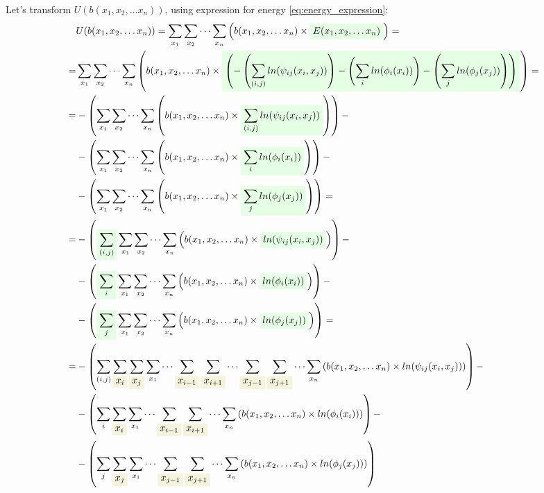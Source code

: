 \documentclass[fleqn,leqno]{article}
\newcommand{\highlight}[1]{\colorbox{green!10}{$\displaystyle#1$}}
\newcommand{\highlightred}[1]{\colorbox{olive!10}{$\displaystyle#1$}}
\begin{document}
Let's transform $U(b(x_1,x_2,\dots x_n))$, using expression for energy \eqref{eq:energy_expression}:
\begin{equation}
\begin{split}
   & U(b(x_1,x_2,\dots x_n)) = \sum_{x_1} \sum_{x_2} \cdots \sum_{x_n} \left( b(x_1, x_2, \dots x_n) \times \highlight{E(x_1, x_2, \dots x_n)} \right) = \\
= & \sum_{x_1} \sum_{x_2} \cdots \sum_{x_n} \left( b(x_1, x_2, \dots x_n) \times \highlight{\left( - \left( \sum_{(i, j)} ln(\psi_{ij}(x_i, x_j)) \right) - \left( \sum_{i} ln(\phi_i(x_i)) \right) - \left( \sum_{j} ln(\phi_j(x_j)) \right) \right)} \right) = \\
= & -\left( \sum_{x_1} \sum_{x_2} \cdots \sum_{x_n} \left( b(x_1, x_2, \dots x_n) \times \highlight{\sum_{(i, j)} ln(\psi_{ij}(x_i, x_j))} \right) \right) - \\ 
   & -\left( \sum_{x_1} \sum_{x_2} \cdots \sum_{x_n} \left( b(x_1, x_2, \dots x_n) \times \highlight{\sum_{i} ln(\phi_{i}(x_i))} \right) \right) - \\ 
   & -\left( \sum_{x_1} \sum_{x_2} \cdots \sum_{x_n} \left( b(x_1, x_2, \dots x_n) \times \highlight{\sum_{j} ln(\phi_{j}(x_j))} \right) \right) = \\
= & -\left( \highlight{\sum_{(i, j)}} \sum_{x_1} \sum_{x_2} \cdots \sum_{x_n} \left( b(x_1, x_2, \dots x_n) \times \highlight{ln(\psi_{ij}(x_i, x_j))} \right) \right) - \\
   & -\left( \highlight{\sum_i} \sum_{x_1} \sum_{x_2} \cdots \sum_{x_n} \left( b(x_1, x_2, \dots x_n) \times \highlight{ln(\phi_{i}(x_i))} \right) \right) - \\
   & -\left( \highlight{\sum_j} \sum_{x_1} \sum_{x_2} \cdots \sum_{x_n} \left( b(x_1, x_2, \dots x_n) \times \highlight{ln(\phi_{j}(x_j))} \right) \right) = \\
= & -\left( \sum_{(i, j)} \sum_{\highlightred{x_i}} \sum_{\highlightred{x_j}} \sum_{x_1} \cdots \sum_{\highlightred{x_{i-1}}} \sum_{\highlightred{x_{i+1}}} \cdots \sum_{\highlightred{x_{j-1}}} \sum_{\highlightred{x_{j+1}}} \cdots \sum_{x_n} \left( b(x_1, x_2, \dots x_n) \times ln(\psi_{ij}(x_i, x_j)) \right) \right) - \\
   & -\left( \sum_{i} \sum_{\highlightred{x_i}} \sum_{x_1} \cdots \sum_{\highlightred{x_{i-1}}} \sum_{\highlightred{x_{i+1}}} \cdots \sum_{x_n} \left( b(x_1, x_2, \dots x_n) \times ln(\phi_{i}(x_i)) \right) \right) - \\
   & -\left( \sum_{j} \sum_{\highlightred{x_j}} \sum_{x_1} \cdots \sum_{\highlightred{x_{j-1}}} \sum_{\highlightred{x_{j+1}}} \cdots \sum_{x_n} \left( b(x_1, x_2, \dots x_n) \times ln(\phi_{j}(x_j)) \right) \right)
\end{split}
\end{equation}
\end{document}
